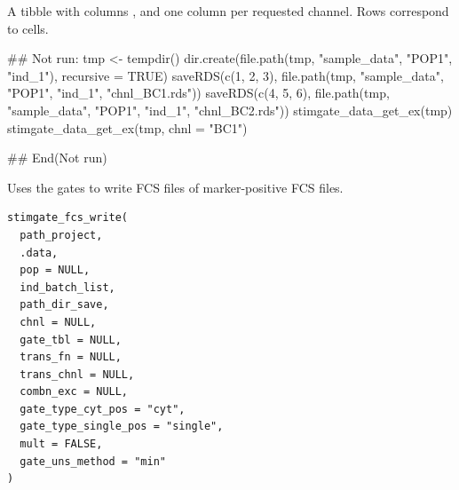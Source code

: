 \documentclass[letterpaper]{book}
\begin{document}
%
\begin{Value}
A tibble with columns ,  and one column per requested channel. Rows correspond to cells.
\end{Value}
%
\begin{Examples}
\begin{ExampleCode}
## Not run: 
tmp <- tempdir()
dir.create(file.path(tmp, "sample_data", "POP1", "ind_1"), recursive = TRUE)
saveRDS(c(1, 2, 3), file.path(tmp, "sample_data", "POP1", "ind_1", "chnl_BC1.rds"))
saveRDS(c(4, 5, 6), file.path(tmp, "sample_data", "POP1", "ind_1", "chnl_BC2.rds"))
stimgate_data_get_ex(tmp)
stimgate_data_get_ex(tmp, chnl = "BC1")

## End(Not run)
\end{ExampleCode}
\end{Examples}
%
\begin{Description}
Uses the gates to write FCS files of marker-positive FCS files.
\end{Description}
%
\begin{Usage}
\begin{verbatim}
stimgate_fcs_write(
  path_project,
  .data,
  pop = NULL,
  ind_batch_list,
  path_dir_save,
  chnl = NULL,
  gate_tbl = NULL,
  trans_fn = NULL,
  trans_chnl = NULL,
  combn_exc = NULL,
  gate_type_cyt_pos = "cyt",
  gate_type_single_pos = "single",
  mult = FALSE,
  gate_uns_method = "min"
)
\end{verbatim}
\end{Usage}
%
\end{document}
